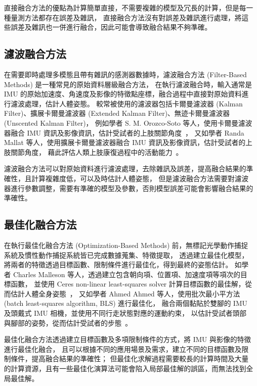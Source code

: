直接融合方法的優點為計算簡單直接，不需要複雜的模型及冗長的計算，但是每一種量測方法都存在誤差及雜訊，
直接融合方法沒有對誤差及雜訊進行處理，將這些誤差及雜訊也一併進行融合，因此可能會導致融合結果不夠準確。

\subsection*{濾波融合方法}
在需要即時處理多模態且帶有雜訊的感測器數據時，濾波融合方法 (Filter-Based Methods) 是一種常見的原始資料層級融合方法，
在執行濾波融合時，輸入通常是 IMU 的原始加速度、角速度及影像的特徵點座標，融合過程中直接對原始資料進行濾波處理，估計人體姿態。
較常被使用的濾波器包括卡爾曼濾波器 (Kalman Filter)、擴展卡爾曼濾波器 (Extended Kalman Filter)、無迹卡爾曼濾波器 (Unscented Kalman Filter)，
例如學者 S. M. Orozco-Soto 等人，使用卡爾曼濾波器融合 IMU 資訊及影像資訊，估計受試者的上肢關節角度~\cite{orozco2019development}，
又如學者 Randa Mallat 等人，使用擴展卡爾曼濾波器融合 IMU 資訊及影像資訊，估計受試者的上肢關節角度，
藉此評估人類上肢康復過程中的活動能力~\cite{mallat2020upper}。

濾波融合方法可以對原始資料進行濾波處理，去除雜訊及誤差，提高融合結果的準確性，且計算複雜度低，可以及時估計人體姿態，
但是濾波融合方法需要對濾波器進行參數調整，需要有準確的模型及參數，否則模型誤差可能會影響融合結果的準確性。

\subsection*{最佳化融合方法}
在執行最佳化融合方法 (Optimization-Based Methods) 前，無標記光學動作捕捉系統及慣性動作捕捉系統皆已完成數據蒐集、特徵提取，
透過建立最佳化模型，將兩者的特徵透過目標函數、限制條件進行最佳化，得到最終的姿態估計。
如學者 Charles Malleson 等人，透過建立包含朝向項、位置項、加速度項等項次的目標函數，
並使用 Ceres non-linear least-squares solver 計算目標函數的最佳解，從而估計人體全身姿態~\cite{malleson2017real}，
又如學者 Ahmed Ahmed 等人，使用批次最小平方法 (batch least-squares algorithm, BLS) 進行最佳化，
融合兩個黏貼於雙腳的 IMU 及頭戴式 IMU 相機，並使用不同行走狀態對應的運動約束，
以估計受試者頭部與腳部的姿勢，從而估計受試者的步態~\cite{ahmed2018visual}。

最佳化融合方法透過建立目標函數及多項限制條件的方式，將 IMU 與影像的特徵進行最佳化融合，
且可以根據不同的應用場景及需求，建立不同的目標函數及限制條件，提高融合結果的準確性；
但最佳化求解過程需要較長的計算時間及大量的計算資源，且有一些最佳化演算法可能會陷入局部最佳解的誤區，而無法找到全局最佳解。

